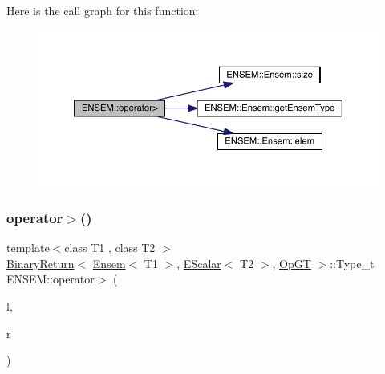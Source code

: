 Here is the call graph for this function\+:\nopagebreak
\begin{figure}[H]
\begin{center}
\leavevmode
\includegraphics[width=350pt]{d1/d9e/group__eensem_ga27f81ac9863b6ebd1af9a0927fd2c356_cgraph}
\end{center}
\end{figure}
\mbox{\label{group__eensem_gadb5372b36c1e21728de4e36358b59440}} 
\subsubsection{\texorpdfstring{operator$>$()}{operator>()}\hspace{0.1cm}{\footnotesize\ttfamily [2/3]}}
{\footnotesize\ttfamily template$<$class T1 , class T2 $>$ \\
\mbox{\hyperlink{structENSEM_1_1BinaryReturn}{Binary\+Return}}$<$ \mbox{\hyperlink{classENSEM_1_1Ensem}{Ensem}}$<$ T1 $>$, \mbox{\hyperlink{classENSEM_1_1EScalar}{E\+Scalar}}$<$ T2 $>$, \mbox{\hyperlink{structENSEM_1_1OpGT}{Op\+GT}} $>$\+::Type\+\_\+t E\+N\+S\+E\+M\+::operator$>$ (\begin{DoxyParamCaption}\item[{const \mbox{\hyperlink{classENSEM_1_1Ensem}{Ensem}}$<$ T1 $>$ \&}]{l,  }\item[{const \mbox{\hyperlink{classENSEM_1_1EScalar}{E\+Scalar}}$<$ T2 $>$ \&}]{r }\end{DoxyParamCaption})\hspace{0.3cm}{\ttfamily [inline]}}

